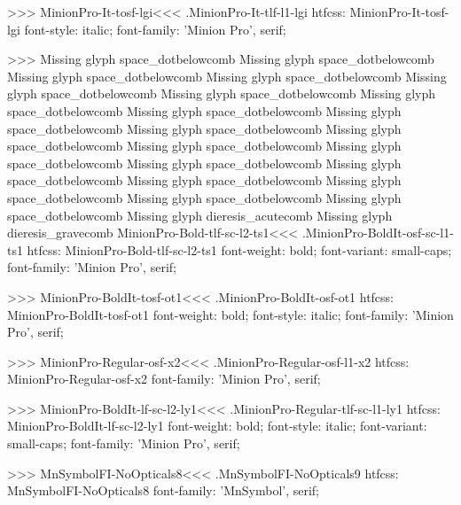 {>>>
\<MinionPro-It-tosf-lgi\><<<
.MinionPro-It-tlf-l1-lgi
htfcss:  MinionPro-It-tosf-lgi  font-style: italic; font-family: 'Minion Pro', serif;

>>>
Missing glyph	space_dotbelowcomb
Missing glyph	space_dotbelowcomb
Missing glyph	space_dotbelowcomb
Missing glyph	space_dotbelowcomb
Missing glyph	space_dotbelowcomb
Missing glyph	space_dotbelowcomb
Missing glyph	space_dotbelowcomb
Missing glyph	space_dotbelowcomb
Missing glyph	space_dotbelowcomb
Missing glyph	space_dotbelowcomb
Missing glyph	space_dotbelowcomb
Missing glyph	space_dotbelowcomb
Missing glyph	space_dotbelowcomb
Missing glyph	space_dotbelowcomb
Missing glyph	space_dotbelowcomb
Missing glyph	space_dotbelowcomb
Missing glyph	space_dotbelowcomb
Missing glyph	space_dotbelowcomb
Missing glyph	space_dotbelowcomb
Missing glyph	dieresis_acutecomb
Missing glyph	dieresis_gravecomb
\<MinionPro-Bold-tlf-sc-l2-ts1\><<<
.MinionPro-BoldIt-osf-sc-l1-ts1
htfcss:  MinionPro-Bold-tlf-sc-l2-ts1  font-weight: bold; font-variant: small-caps; font-family: 'Minion Pro', serif;

>>>
\<MinionPro-BoldIt-tosf-ot1\><<<
.MinionPro-BoldIt-osf-ot1
htfcss:  MinionPro-BoldIt-tosf-ot1  font-weight: bold; font-style: italic; font-family: 'Minion Pro', serif;

>>>
\<MinionPro-Regular-osf-x2\><<<
.MinionPro-Regular-osf-l1-x2
htfcss:  MinionPro-Regular-osf-x2  font-family: 'Minion Pro', serif;

>>>
\<MinionPro-BoldIt-lf-sc-l2-ly1\><<<
.MinionPro-Regular-tlf-sc-l1-ly1
htfcss:  MinionPro-BoldIt-lf-sc-l2-ly1  font-weight: bold; font-style: italic; font-variant: small-caps; font-family: 'Minion Pro', serif;

>>>
\<MnSymbolFI-NoOpticals8\><<<
.MnSymbolFI-NoOpticals9
htfcss:  MnSymbolFI-NoOpticals8  font-family: 'MnSymbol', serif;

}
